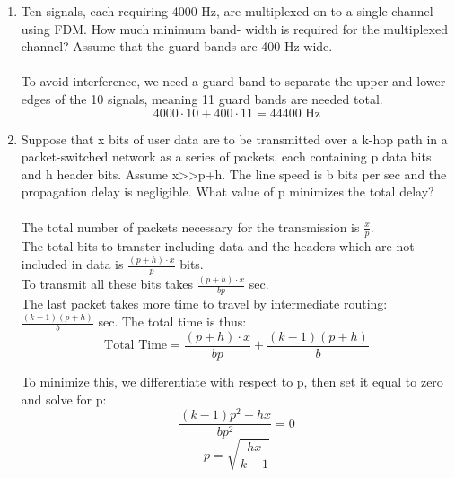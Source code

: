 \documentclass[12pt]{article}
\begin{document}
\begin{enumerate}
\item Ten signals, each requiring 4000 Hz, are multiplexed on to a single channel using FDM. How much minimum band-
width is required for the multiplexed channel? Assume that the guard bands are 400 Hz wide. 
\\ \\
To avoid interference, we need a guard band to separate the upper and lower edges of the 10 signals, meaning 11 guard bands are needed total. 
\[ \boxed{4000 \cdot 10 + 400 \cdot 11 = \textrm{44400 Hz}} \]

\newpage

\item Suppose that x bits of user data are to be transmitted over a k-hop path in a packet-switched network as a series of  packets, each containing p data bits and h header bits. Assume x>>p+h. The line speed is b bits per sec and the propagation delay is negligible.  What value of p minimizes the total delay? 
\\ \\
The total number of packets necessary for the transmission is $\frac{x}{p}$. \\
The total bits to transter including data and the headers which are not included in data is $\frac{(p+h)\cdot x}{p}$ bits. \\
To transmit all these bits takes $\frac{(p+h)\cdot x}{bp}$ sec. \\ 
The last packet takes more time to travel by intermediate routing: $\frac{(k-1)(p+h)}{b}$ sec. The total time is thus: 
\[ \textrm{Total Time} = \frac{(p+h)\cdot x}{bp} + \frac{(k-1)(p+h)}{b} \]

To minimize this, we differentiate with respect to p, then set it equal to zero and solve for p: \[ \frac{(k-1)p^2-hx}{bp^2} = 0 \]
\[ \boxed{ p = \sqrt{\frac{hx}{k-1}} } \]



\end{enumerate}
\end{document}
